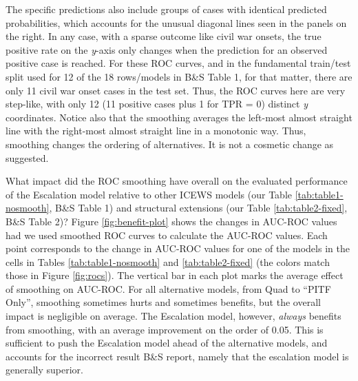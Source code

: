\documentclass[
]{article}
\begin{document}
The specific predictions also include groups of cases with identical predicted probabilities, which accounts for the unusual diagonal lines seen in the panels on the right. In any case, with a sparse outcome like civil war onsets, the true positive rate on the \emph{y}-axis only changes when the prediction for an observed positive case is reached. For these ROC curves, and in the fundamental train/test split used for 12 of the 18 rows/models in B\&S Table 1, for that matter, there are only 11 civil war onset cases in the test set. Thus, the ROC curves here are very step-like, with only 12 (11 positive cases plus 1 for TPR = 0) distinct \emph{y} coordinates. Notice also that the smoothing averages the left-most almost straight line with the right-most almost straight line in a monotonic way. Thus, smoothing changes the ordering of alternatives. It is not a cosmetic change as suggested.

What impact did the ROC smoothing have overall on the evaluated performance of the Escalation model relative to other ICEWS models (our Table \ref{tab:table1-nosmooth}, B\&S Table 1) and structural extensions (our Table \ref{tab:table2-fixed}, B\&S Table 2)? Figure \ref{fig:benefit-plot} shows the changes in AUC-ROC values had we used smoothed ROC curves to calculate the AUC-ROC values. Each point corresponds to the change in AUC-ROC values for one of the models in the cells in Tables \ref{tab:table1-nosmooth} and \ref{tab:table2-fixed} (the colors match those in Figure \ref{fig:rocs}). The vertical bar in each plot marks the average effect of smoothing on AUC-ROC. For all alternative models, from Quad to ``PITF Only'', smoothing sometimes hurts and sometimes benefits, but the overall impact is negligible on average. The Escalation model, however, \emph{always} benefits from smoothing, with an average improvement on the order of 0.05. This is sufficient to push the Escalation model ahead of the alternative models, and accounts for the incorrect result B\&S report, namely that the escalation model is generally superior.
\end{document}
